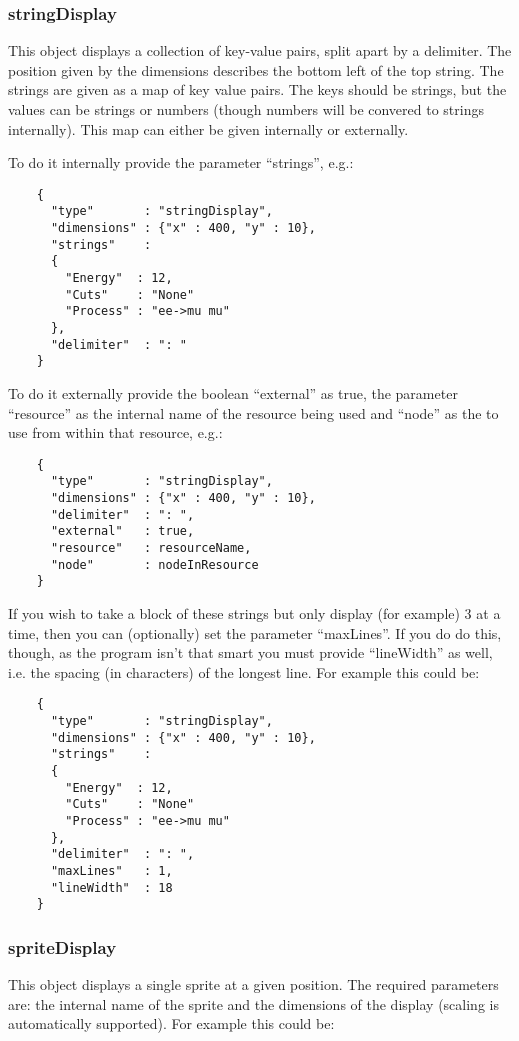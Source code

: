 \documentclass[a4paper]{article}
\begin{document}
  \subsubsection{stringDisplay}
  This object displays a collection of key-value pairs, split apart by
  a delimiter. The position given by the dimensions describes the bottom
  left of the top string. The strings are given as a map of key value pairs.
  The keys should be strings, but the values can be strings or numbers
  (though numbers will be convered to strings internally). This map can 
  either be given internally or externally. 

  To do it internally provide the parameter ``strings'', e.g.:

  \begin{verbatim}
    {
      "type"       : "stringDisplay",
      "dimensions" : {"x" : 400, "y" : 10},
      "strings"    :
      {
        "Energy"  : 12,
        "Cuts"    : "None"
        "Process" : "ee->mu mu"
      },
      "delimiter"  : ": "
    }
  \end{verbatim}
  
  To do it externally provide the boolean ``external'' as true, the 
  parameter ``resource'' as the internal name of the resource being used 
  and ``node'' as the to use from within that resource, e.g.:
  
  \begin{verbatim}
    {
      "type"       : "stringDisplay",
      "dimensions" : {"x" : 400, "y" : 10},
      "delimiter"  : ": ",
      "external"   : true,
      "resource"   : resourceName,
      "node"       : nodeInResource
    }
  \end{verbatim}

  If you wish to take a block of these strings but only display (for
  example) 3 at a time, then you can (optionally) set the parameter
  ``maxLines''. If you do do this, though, as the program isn't that smart 
  you must provide ``lineWidth'' as well, i.e. the spacing (in characters) 
  of the longest line. For example this could be:

  \begin{verbatim}
    {
      "type"       : "stringDisplay",
      "dimensions" : {"x" : 400, "y" : 10},
      "strings"    :
      {
        "Energy"  : 12,
        "Cuts"    : "None"
        "Process" : "ee->mu mu"
      },
      "delimiter"  : ": ",
      "maxLines"   : 1,
      "lineWidth"  : 18
    }
  \end{verbatim}


  \subsubsection{spriteDisplay}
  This object displays a single sprite at a given position. The required
  parameters are: the internal name of the sprite and the dimensions of the
  display (scaling is automatically supported). For example this could be:
\end{document}
